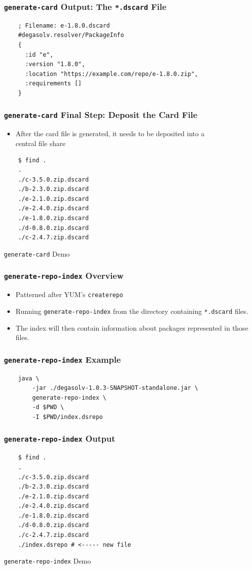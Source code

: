 \documentclass{beamer}
\begin{document}
\begin{frame}[fragile]
  \frametitle{\texttt{generate-card} Output: The \texttt{*.dscard} File}
\begin{verbatim}
    ; Filename: e-1.8.0.dscard
    #degasolv.resolver/PackageInfo
    {
      :id "e",
      :version "1.8.0",
      :location "https://example.com/repo/e-1.8.0.zip",
      :requirements []
    }
\end{verbatim}
\end{frame}
\begin{frame}[fragile]
  \frametitle{\texttt{generate-card} Final Step: Deposit the Card File}
  \begin{itemize}
  \item After the card file is generated, it needs to be deposited into a \\
    central file share
  \end{itemize}
\begin{verbatim}
    $ find .
    .
    ./c-3.5.0.zip.dscard
    ./b-2.3.0.zip.dscard
    ./e-2.1.0.zip.dscard
    ./e-2.4.0.zip.dscard
    ./e-1.8.0.zip.dscard
    ./d-0.8.0.zip.dscard
    ./c-2.4.7.zip.dscard
\end{verbatim}
\end{frame}
\begin{frame}
  \centerline{\color{blue}\Large \texttt{generate-card} Demo}
\end{frame}
\begin{frame}
  \frametitle{\texttt{generate-repo-index} Overview}
  \begin{itemize}
  \item Patterned after YUM's \texttt{createrepo}
  \item Running \texttt{generate-repo-index} from the directory containing \texttt{*.dscard}
    files.
  \item The index will then contain information about packages represented in those
    files.
  \end{itemize}
\end{frame}
\begin{frame}[fragile]
  \frametitle{\texttt{generate-repo-index} Example}
\begin{verbatim}
    java \
        -jar ./degasolv-1.0.3-SNAPSHOT-standalone.jar \
        generate-repo-index \
        -d $PWD \
        -I $PWD/index.dsrepo
\end{verbatim}
\end{frame}
\begin{frame}[fragile]
  \frametitle{\texttt{generate-repo-index} Output}
\begin{verbatim}
    $ find .
    .
    ./c-3.5.0.zip.dscard
    ./b-2.3.0.zip.dscard
    ./e-2.1.0.zip.dscard
    ./e-2.4.0.zip.dscard
    ./e-1.8.0.zip.dscard
    ./d-0.8.0.zip.dscard
    ./c-2.4.7.zip.dscard
    ./index.dsrepo # <----- new file
\end{verbatim}
\end{frame}
\begin{frame}
  \centerline{\color{blue}\Large \texttt{generate-repo-index} Demo}
\end{frame}
\end{document}
